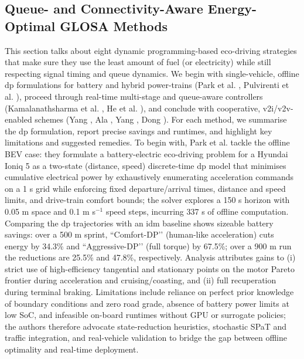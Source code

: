 \subsection{Queue- and Connectivity-Aware Energy-Optimal GLOSA Methods}
\label{subsec:eco_dp_queue}

This section talks about eight dynamic programming-based eco-driving strategies that make sure they use the least amount of fuel (or electricity) while still respecting signal timing and queue dynamics. We begin with single-vehicle, offline \ac{dp} formulations for battery and hybrid power-trains (Park et al. \cite{Park2024}, Pulvirenti et al. \cite{Pulvirenti2023}), proceed through real-time multi-stage and queue-aware controllers (Kamalanathsharma et al. \cite{Kamalanathsharma2013}, He et al. \cite{He2015}), and conclude with cooperative, \ac{v2i}/\ac{v2v}-enabled schemes (Yang \cite{Yang2017}, Ala \cite{Ala2016}, Yang \cite{Yang2021}, Dong \cite{Dong2024}). For each method, we summarise the \ac{dp} formulation, report precise savings and runtimes, and highlight key limitations and suggested remedies.
\mynewline
To begin with, Park et al. \cite{Park2024} tackle the offline BEV case: they formulate a battery-electric eco-driving problem for a Hyundai Ioniq 5 as a two-state (distance, speed) discrete-time \ac{dp} model that minimises cumulative electrical power by exhaustively enumerating acceleration commands on a 1 s grid while enforcing fixed departure/arrival times, distance and speed limits, and drive-train comfort bounds; the solver explores a 150 s horizon with 0.05 m space and 0.1 m s$^{-1}$ speed steps, incurring 337 s of offline computation. Comparing the \ac{dp} trajectories with an \ac{idm} baseline shows sizeable battery savings: over a 500 m sprint, “Comfort-DP’’ (human-like acceleration) cuts energy by 34.3\% and “Aggressive-DP’’ (full torque) by 67.5\%; over a 900 m run the reductions are 25.5\% and 47.8\%, respectively.  Analysis attributes gains to (i) strict use of high-efficiency tangential and stationary points on the motor Pareto frontier during acceleration and cruising/coasting, and (ii) full recuperation during terminal braking. Limitations include reliance on perfect prior knowledge of boundary conditions and zero road grade, absence of battery power limits at low SoC, and infeasible on-board runtimes without GPU or surrogate policies; the authors therefore advocate state-reduction heuristics, stochastic SPaT and traffic integration, and real-vehicle validation to bridge the gap between offline optimality and real-time deployment.
\mynewline
